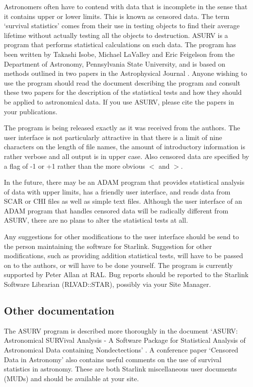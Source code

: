 Astronomers often have to contend with data that is incomplete in the sense
that it contains upper or lower limits. This is known as censored data. The
term `survival statistics' comes from their use in testing objects to find
their average lifetime without actually testing all the objects to destruction.
ASURV is a program that performs statistical calculations on such data. The
program has been written by Takashi Isobe, Michael LaValley and Eric Feigelson
from the Department of Astronomy, Pennsylvania State University, and is based
on methods outlined in two papers in the Astrophysical Journal
\cite{isobe-1,isobe-2}. Anyone wishing to use the program should read the
document describing the program and consult these two papers for the
description of the statistical tests and how they should be applied to
astronomical data. If you use ASURV, please cite the papers
\cite{isobe-1,isobe-2} in your publications.

The program is being released exactly as it was received from the authors. The
user interface is not particularly attractive in that there is a limit of nine
characters on the length of file names, the amount of introductory information
is rather verbose and all output is in upper case. Also censored data are
specified by a flag of -1 or +1 rather than the more obvious $<$ and $>$. 

In the future, there may be an ADAM program that provides statistical analysis
of data with upper limits, has a friendly user interface, and reads data from
SCAR or CHI files as well as simple text files. Although the user interface of
an ADAM program that handles censored data will be radically different from
ASURV, there are no plans to alter the statistical tests at all. 

Any suggestions for other modifications to the user interface should be send to
the person maintaining the software for Starlink. Suggestion for other
modifications, such as providing addition statistical tests, will have to be
passed on to the authors, or will have to be done yourself. The program is
currently supported by Peter Allan at RAL. Bug reports should be reported to
the Starlink Software Librarian (RLVAD::STAR), possibly via your Site Manager. 

\subsection{Other documentation}

The ASURV program is described more thoroughly in the document `ASURV:
Astronomical SURVival Analysis - A Software Package for Statistical Analysis of
Astronomical Data containing Nondectections' \cite{mud-1}. A conference paper
`Censored Data in Astronomy' \cite{mud-2} also contains useful comments on the
use of survival statistics in astronomy. These are both Starlink miscellaneous
user documents (MUDs) and should be available at your site.

